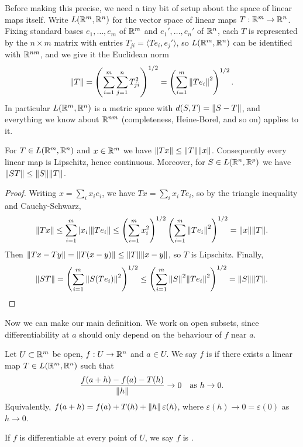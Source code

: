 \documentclass[a4paper]{scrartcl}
\begin{document}
Before making this precise, we need a tiny bit of setup about the space of linear maps itself. Write $L(\mathbb{R}^m, \mathbb{R}^n)$ for the vector space of linear maps $T: \mathbb{R}^m \rightarrow \mathbb{R}^n$. Fixing standard bases $e_1, \dots, e_m$ of $\mathbb{R}^m$ and $e_1', \dots, e_n'$ of $\mathbb{R}^n$, each $T$ is represented by the $n \times m$ matrix with entries $T_{ji} = \langle Te_i, e_j' \rangle$, so $L(\mathbb{R}^m, \mathbb{R}^n)$ can be identified with $\mathbb{R}^{nm}$, and we give it the Euclidean norm
$$
\norm{T} = \left(\sum_{i = 1}^m \sum_{j = 1}^n T_{ji}^2\right)^{1/2} = \left( \sum_{i = 1}^m \norm{Te_i}^2 \right)^{1/2}.
$$
In particular $L(\mathbb{R}^m, \mathbb{R}^n)$ is a metric space with $d(S, T) = \norm{S - T}$, and everything we know about $\mathbb{R}^{nm}$ (completeness, Heine-Borel, and so on) applies to it.

\begin{lemma}\label{lemma:linlip}
    For $T \in L(\mathbb{R}^m, \mathbb{R}^n)$ and $x \in \mathbb{R}^m$ we have $\norm{Tx} \leq \norm{T} \norm{x}$. Consequently every linear map is Lipschitz, hence continuous. Moreover, for $S \in L(\mathbb{R}^n, \mathbb{R}^p)$ we have $\norm{ST} \leq \norm{S}\norm{T}$.
\end{lemma}
\begin{proof}
    Writing $x = \sum_i x_i e_i$, we have $Tx = \sum_i x_i \, Te_i$, so by the triangle inequality and Cauchy-Schwarz,
    $$
    \norm{Tx} \leq \sum_{i = 1}^m |x_i| \norm{Te_i} \leq \left(\sum_{i = 1}^m x_i^2\right)^{1/2} \left(\sum_{i = 1}^m \norm{Te_i}^2\right)^{1/2} = \norm{x} \norm{T}.
    $$
    Then $\norm{Tx - Ty} = \norm{T(x - y)} \leq \norm{T}\norm{x - y}$, so $T$ is Lipschitz. Finally,
    $$
    \norm{ST} = \left(\sum_{i = 1}^m \norm{S(Te_i)}^2\right)^{1/2} \leq \left(\sum_{i = 1}^m \norm{S}^2\norm{Te_i}^2\right)^{1/2} = \norm{S} \norm{T}. \qedhere
    $$
\end{proof}

Now we can make our main definition. We work on open subsets, since differentiability at $a$ should only depend on the behaviour of $f$ near $a$.

\begin{definition}[Differentiability]
    Let $U \subset \mathbb{R}^m$ be open, $f: U \rightarrow \mathbb{R}^n$ and $a \in U$. We say $f$ is  if there exists a linear map $T \in L(\mathbb{R}^m, \mathbb{R}^n)$ such that
    $$
    \frac{f(a + h) - f(a) - T(h)}{\norm{h}} \rightarrow 0 \quad \text{as } h \rightarrow 0.
    $$
    Equivalently, $f(a + h) = f(a) + T(h) + \norm{h}\, \varepsilon(h)$, where $\varepsilon(h) \rightarrow 0 = \varepsilon(0)$ as $h \rightarrow 0$.

    If $f$ is differentiable at every point of $U$, we say $f$ is .
\end{definition}
\end{document}
